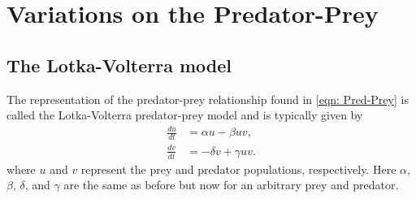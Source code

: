 \section*{Variations on the Predator-Prey}
\subsection*{The Lotka-Volterra model}
The representation of the predator-prey relationship found in \eqref{eqn: Pred-Prey} is called the Lotka-Volterra predator-prey model and is typically given by %
\begin{align*}
	\frac{du}{dt} &= \alpha u - \beta uv,\\
	\frac{dv}{dt} &= -\delta v + \gamma uv.
\end{align*}
where $u$ and $v$ represent the prey and predator populations, respectively. Here $\alpha$, $\beta$, $\delta$, and $\gamma$ are the same as before but now for an arbitrary prey and predator.%

